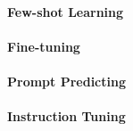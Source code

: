 \paragraph{Few-shot Learning}

\paragraph{Fine-tuning}

\paragraph{Prompt Predicting}

\paragraph{Instruction Tuning}
